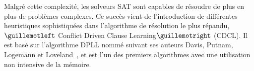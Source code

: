 Malgré cette complexité, les solveurs SAT sont capables de résoudre de plus en plus de problèmes complexes.
Ce succès vient de l'introduction de différentes heuristiques sophistiquées dans 
l'algorithme de résolution le plus répandu, $\guillemotleft$ Conflict Driven Clause Learning$\guillemotright$ (CDCL).
Il est basé sur l'algorithme DPLL nommé suivant ses auteurs Davis, Putnam, Logemann et Loveland~\cite{dpll_62},
et est l'un des premiers algorithmes avec une utilisation non intensive de la mémoire.
%
%
%
%
%

%

